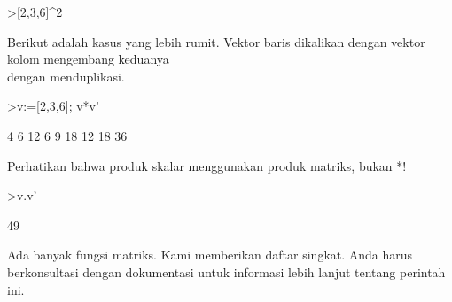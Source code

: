 \documentclass[a4paper,10pt]{article}
\begin{document}
\begin{eulernotebook}
\begin{eulercomment}
\begin{eulercomment}
\begin{eulercomment}
\begin{eulercomment}
\begin{eulercomment}
\end{eulercomment}
\begin{eulerprompt}
>[2,3,6]^2
\end{eulerprompt}
\begin{euleroutput}
  [4,  9,  36]
\end{euleroutput}
\begin{eulercomment}
Berikut adalah kasus yang lebih rumit. Vektor baris dikalikan dengan
vektor kolom mengembang keduanya\\
dengan menduplikasi.
\end{eulercomment}
\begin{eulerprompt}
>v:=[2,3,6]; v*v'
\end{eulerprompt}
\begin{euleroutput}
              4             6            12 
              6             9            18 
             12            18            36 
\end{euleroutput}
\begin{eulercomment}
Perhatikan bahwa produk skalar menggunakan produk matriks, bukan *!
\end{eulercomment}
\begin{eulerprompt}
>v.v'
\end{eulerprompt}
\begin{euleroutput}
  49
\end{euleroutput}
\begin{eulercomment}
Ada banyak fungsi matriks. Kami memberikan daftar singkat. Anda harus
berkonsultasi dengan dokumentasi untuk informasi lebih lanjut tentang
perintah ini.


\end{eulercomment}
\end{eulercomment}
\end{eulercomment}
\end{eulercomment}
\end{eulercomment}
\end{eulernotebook}
\end{document}
